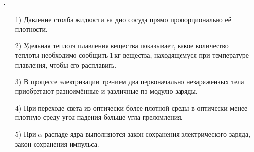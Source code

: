 \documentclass[12pt,a4paper]{article}
\newif\ifShowSolutions
\newcounter{banktask}
\newcommand{\BankTask}[3]{%
  \refstepcounter{banktask}%
  \Needspace{35mm}\par\medskip\noindent\begin{minipage}{\linewidth}%
  \noindent\textbf{\thebanktask.}\quad #2\par
  \ifShowSolutions
    #3\par
    \ifdefined\TutorEdition
      \ifcsname TutorSource#1\endcsname
        \smallskip{\small\csname TutorSource#1\endcsname\par}%
      \fi
    \fi
  \fi
  \end{minipage}\par\medskip
}
\begin{document}
\BankTask{46BA23}{
\begin{enumerate}
\item[1)] Давление столба жидкости на дно сосуда прямо пропорционально её плотности.
\item[2)] Удельная теплота плавления вещества показывает, какое количество теплоты необходимо сообщить \(1\,\text{кг}\) вещества, находящемуся при температуре плавления, чтобы его расплавить.
\item[3)] В процессе электризации трением два первоначально незаряженных тела приобретают разноимённые и различные по модулю заряды.
\item[4)] При переходе света из оптически более плотной среды в оптически менее плотную среду угол падения больше угла преломления.
\item[5)] При \(\alpha\)-распаде ядра выполняются закон сохранения электрического заряда, закон сохранения импульса.
\end{enumerate}
}{
\smallskip\noindent\textbf{Решение от GPT}\par
1) Верно: гидростатическое давление \(p=\rho gh\) прямо пропорционально плотности жидкости. 2) Верно: из \(Q=\lambda m\) следует, что удельная теплота плавления равна количеству теплоты для плавления \(1\,\text{кг}\) вещества при температуре плавления. 3) Неверно: по закону сохранения заряда \(q_1+q_2=0\), поэтому заряды равны по модулю. 4) Неверно: по закону преломления \(n_1\sin\alpha=n_2\sin\beta\) при \(n_1>n_2\) угол преломления больше угла падения при наклонном падении и наличии преломлённого луча. 5) Верно: при \(\alpha\)-распаде сохраняются электрический заряд и импульс; ответ: \(1,\ 2,\ 5\).
}
\end{document}
